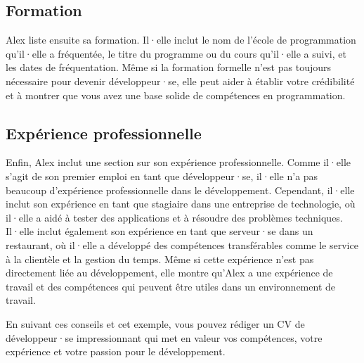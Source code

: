 \subsection{Formation}

Alex liste ensuite sa formation. Il·elle inclut le nom de l'école de programmation qu'il·elle a fréquentée, le titre du programme ou du cours qu'il·elle a suivi, et les dates de fréquentation. Même si la formation formelle n'est pas toujours nécessaire pour devenir développeur·se, elle peut aider à établir votre crédibilité et à montrer que vous avez une base solide de compétences en programmation.

\subsection{Expérience professionnelle}

Enfin, Alex inclut une section sur son expérience professionnelle. Comme il·elle s'agit de son premier emploi en tant que développeur·se, il·elle n'a pas beaucoup d'expérience professionnelle dans le développement. Cependant, il·elle inclut son expérience en tant que stagiaire dans une entreprise de technologie, où il·elle a aidé à tester des applications et à résoudre des problèmes techniques. Il·elle inclut également son expérience en tant que serveur·se dans un restaurant, où il·elle a développé des compétences transférables comme le service à la clientèle et la gestion du temps. Même si cette expérience n'est pas directement liée au développement, elle montre qu'Alex a une expérience de travail et des compétences qui peuvent être utiles dans un environnement de travail.

En suivant ces conseils et cet exemple, vous pouvez rédiger un CV de développeur·se impressionnant qui met en valeur vos compétences, votre expérience et votre passion pour le développement.

